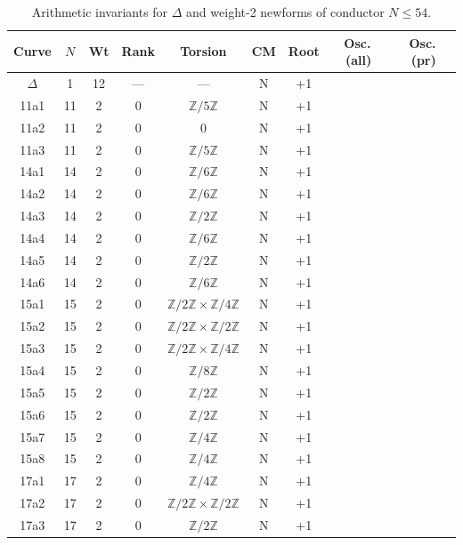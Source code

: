 \begin{table}[htbp]
\centering
\small
\caption{Arithmetic invariants for $\Delta$ and weight-2 newforms of conductor $N \le 54$.}
\label{tab:curve_groups_54}
\begin{tabular}{ccccccccc}
\toprule
Curve & $N$ & Wt & Rank & Torsion & CM & Root & Osc.\,(all) & Osc.\,(pr) \\
\midrule
$\Delta$ & 1 & 12 & --- & --- & N & +1 &  &  \\
11a1 & 11 & 2 & 0 & $\mathbb{Z}/5\mathbb{Z}$ & N & +1 &  &  \\
11a2 & 11 & 2 & 0 & 0 & N & +1 &  &  \\
11a3 & 11 & 2 & 0 & $\mathbb{Z}/5\mathbb{Z}$ & N & +1 &  &  \\
14a1 & 14 & 2 & 0 & $\mathbb{Z}/6\mathbb{Z}$ & N & +1 &  &  \\
14a2 & 14 & 2 & 0 & $\mathbb{Z}/6\mathbb{Z}$ & N & +1 &  &  \\
14a3 & 14 & 2 & 0 & $\mathbb{Z}/2\mathbb{Z}$ & N & +1 &  &  \\
14a4 & 14 & 2 & 0 & $\mathbb{Z}/6\mathbb{Z}$ & N & +1 &  &  \\
14a5 & 14 & 2 & 0 & $\mathbb{Z}/2\mathbb{Z}$ & N & +1 &  &  \\
14a6 & 14 & 2 & 0 & $\mathbb{Z}/6\mathbb{Z}$ & N & +1 &  &  \\
15a1 & 15 & 2 & 0 & $\mathbb{Z}/2\mathbb{Z} \times \mathbb{Z}/4\mathbb{Z}$ & N & +1 &  &  \\
15a2 & 15 & 2 & 0 & $\mathbb{Z}/2\mathbb{Z} \times \mathbb{Z}/2\mathbb{Z}$ & N & +1 &  &  \\
15a3 & 15 & 2 & 0 & $\mathbb{Z}/2\mathbb{Z} \times \mathbb{Z}/4\mathbb{Z}$ & N & +1 &  &  \\
15a4 & 15 & 2 & 0 & $\mathbb{Z}/8\mathbb{Z}$ & N & +1 &  &  \\
15a5 & 15 & 2 & 0 & $\mathbb{Z}/2\mathbb{Z}$ & N & +1 &  &  \\
15a6 & 15 & 2 & 0 & $\mathbb{Z}/2\mathbb{Z}$ & N & +1 &  &  \\
15a7 & 15 & 2 & 0 & $\mathbb{Z}/4\mathbb{Z}$ & N & +1 &  &  \\
15a8 & 15 & 2 & 0 & $\mathbb{Z}/4\mathbb{Z}$ & N & +1 &  &  \\
17a1 & 17 & 2 & 0 & $\mathbb{Z}/4\mathbb{Z}$ & N & +1 &  &  \\
17a2 & 17 & 2 & 0 & $\mathbb{Z}/2\mathbb{Z} \times \mathbb{Z}/2\mathbb{Z}$ & N & +1 &  &  \\
17a3 & 17 & 2 & 0 & $\mathbb{Z}/2\mathbb{Z}$ & N & +1 &  &  \\

\end{tabular}
\end{table}
